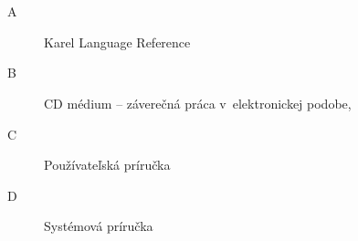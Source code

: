 
\chapter*{\appendixlistname}

\begin{description}
	\item[\appendixname{} A] Karel Language Reference
    \item[\appendixname{} B] CD médium -- záverečná práca v~elektronickej podobe,
    \item[\appendixname{} C] Používateľská príručka
    \item[\appendixname{} D] Systémová príručka
\end{description}
